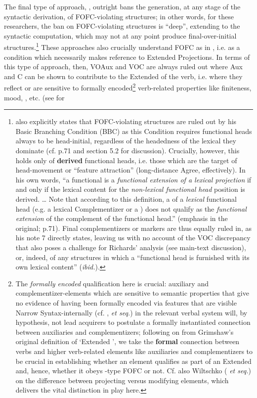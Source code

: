 \documentclass[output=paper]{LSP/langsci}
\begin{document}
\largerpage[-2]
The final type of approach, , outright bans the generation, at any stage of the syntactic derivation, of FOFC-violating structures; in other words, for these researchers, the ban on FOFC-violating structures is “deep”, extending to the syntactic computation, which may not at any point produce final-over-initial structures.\footnote{\citet{Haider2013} also explicitly states that FOFC-violating structures are ruled out by his Basic Branching Condition (BBC) as this Condition requires functional heads always to be head-initial, regardless of the headedness of the lexical  they dominate (cf. p.71 and section 5.2 for discussion). Crucially, however, this holds only of \textbf{derived} functional heads, i.e. those which are the target of head-movement or “feature attraction” (long-distance Agree, effectively). In his own words, “a functional  is a \textit{functional extension of a lexical projection} if and only if the lexical content for the \textit{non-lexical functional head} position is derived. … Note that according to this definition, a  of a \textit{lexical} functional head (e.g. a lexical Complementizer or a ) does not qualify as the \textit{functional extension} of the complement of the functional head.” (emphasis in the original; p.71).  Final complementizers or  markers are thus equally ruled in, as his note 7 directly states, leaving us with no account of the VOC discrepancy that also poses a challenge for Richards’ analysis (see main-text discussion), or, indeed, of any structures in which a “functional head is furnished with its own lexical content” (\textit{ibid.}).}  These approaches also crucially understand FOFC as in , i.e. as a condition which necessarily makes {reference} to Extended Projections. In terms of this type of approach, then, VOAux and VOC are always ruled out where Aux and C can be shown to contribute to the Extended  of the verb, i.e. where they reflect or are sensitive to formally encoded\footnote{The \textit{formally encoded} qualification here is crucial: auxiliary and complementizer-elements which are sensitive to semantic properties that give no evidence of having been formally encoded via features that are visible Narrow Syntax-internally (cf. \citealt{Chomsky1995}, \citealt{Biberauer2011} \textit{et seq.}) in the relevant verbal system will, by hypothesis, not lead acquirers to postulate a formally instantiated connection between auxiliaries and complementizers; following on from Grimshaw’s original definition of ‘Extended ’, we take the \textbf{formal} connection between verbs and higher verb-related elements like auxiliaries and complementizers to be crucial in establishing whether an element qualifies as part of an Extended  and, hence, whether it obeys -type FOFC or not. Cf. also Wiltschko (\citeyear{Wiltschko2014} \textit{et seq.}) on the difference between projecting versus modifying elements, which delivers the vital distinction in play here.}  verb-related properties like finiteness, mood, , etc. (see \citealt{Biberauer2017optionalv2} for 
\end{document}
